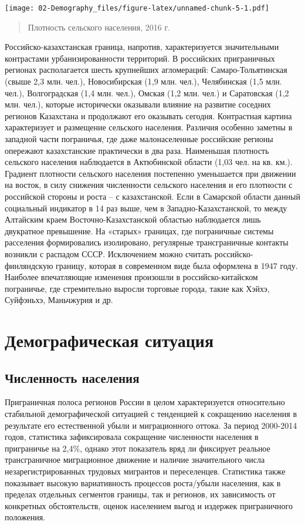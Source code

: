 \documentclass[]{book}
\begin{document}
\texttt{[image: 02-Demography\_files/figure-latex/unnamed-chunk-5-1.pdf]}

\begin{quote}
Плотность сельского населения, 2016 г.
\end{quote}

Российско-казахстанская граница, напротив, характеризуется значительными
контрастами урбанизированности территорий. В российских приграничных
регионах располагается шесть крупнейших агломераций: Самаро-Тольятинская
(свыше 2,3 млн. чел.), Новосибирская (1,9 млн. чел.), Челябинская (1,5
млн. чел.), Волгоградская (1,4 млн. чел.), Омская (1,2 млн. чел.) и
Саратовская (1,2 млн. чел.), которые исторически оказывали влияние на
развитие соседних регионов Казахстана и продолжают его оказывать
сегодня. Контрастная картина характеризует и размещение сельского
населения. Различия особенно заметны в западной части пограничья, где
даже малонаселенные российские регионы опережают казахстанские
практически в два раза. Наименьшая плотность сельского населения
наблюдается в Актюбинской области (1,03 чел. на кв. км.). Градиент
плотности сельского населения постепенно уменьшается при движении на
восток, в силу снижения численности сельского населения и его плотности
с российской стороны и роста -- с казахстанской. Если в Самарской
области данный социальный индикатор в 14 раз выше, чем в
Западно-Казахстанской, то между Алтайским краем Восточно-Казахстанской
областью наблюдается лишь двукратное превышение. На «старых» границах,
где пограничные системы расселения формировались изолировано, регулярные
трансграничные контакты возникли с распадом СССР. Исключением можно
считать российско-финляндскую границу, которая в современном виде была
оформлена в 1947 году. Наиболее впечатляющие изменения произошли в
российско-китайском пограничье, где стремительно выросли торговые
города, такие как Хэйхэ, Суйфэньхэ, Маньчжурия и др.

\section{Демографическая ситуация}\label{demo-situ}

\subsection{Численность населения}\label{demo-situ-pop}

Приграничная полоса регионов России в целом характеризуется относительно
стабильной демографической ситуацией с тенденцией к сокращению населения
в результате его естественной убыли и миграционного оттока. За период
2000-2014 годов, статистика зафиксировала сокращение численности
населения в приграничье на 2,4\%, однако этот показатель вряд ли
фиксирует реальное трансграничное миграционное движение и наличие
значительного числа незарегистрированных трудовых мигрантов и
переселенцев. Статистика также показывает высокую вариативность
процессов роста/убыли населения, как в пределах отдельных сегментов
границы, так и регионов, их зависимость от конкретных обстоятельств,
оценок населением выгод и издержек приграничного положения.
\end{document}
